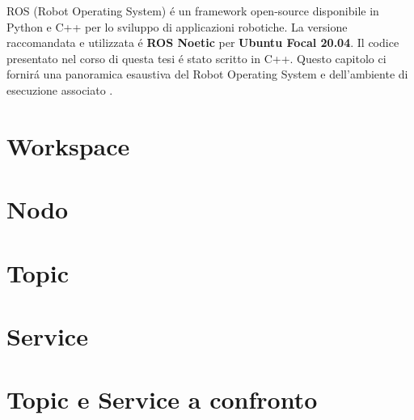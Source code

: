 ROS (Robot Operating System) \'{e} un framework open-source disponibile in Python e C++ per lo sviluppo di applicazioni robotiche.
La versione raccomandata e utilizzata \'{e} \textbf{ROS Noetic} per \textbf{Ubuntu Focal 20.04}. 
Il codice presentato nel corso di questa tesi \'{e} stato scritto in C++.
Questo capitolo ci fornir\'{a} una panoramica esaustiva del Robot Operating System e dell'ambiente di esecuzione associato 
\cite{ros_tutorial}.

\section{Workspace}


\section{Nodo}


\section{Topic}


\section{Service}


\section{Topic e Service a confronto}

